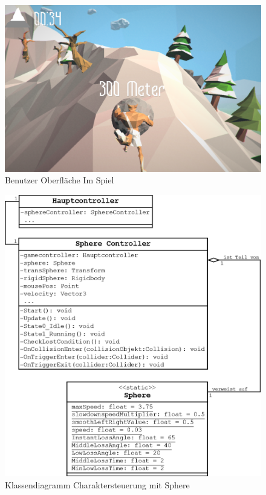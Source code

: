 \begin{figure}[H]
\centering
\caption{Benutzer Oberfläche Im Spiel}
\label{Abb:UIIngame}
\includegraphics[scale=5.25]{Bilder/SisyfoxUI.png}
\end{figure}

\newpage{}
\begin{figure}[H]
\centering
\caption{Klassendiagramm Charaktersteuerung mit Sphere}
\label{Abb:KlassendiaMain}
\includegraphics[width=\textwidth, height=0.75\textheight]{Bilder/Diagramme/KlassendiagrammMain.png}
\end{figure}
\newpage{}

